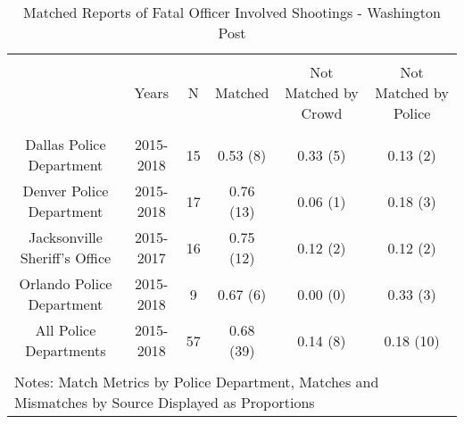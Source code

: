 
\begin{table}[!htbp] \centering 
  \caption{Matched Reports of Fatal Officer Involved Shootings - Washington Post} 
  \label{} 
\footnotesize 
\begin{tabular}{@{\extracolsep{5pt}} cccccc} 
\\[-1.8ex]\hline 
\hline \\[-1.8ex] 
 & Years & N & Matched & Not Matched by Crowd & Not Matched by Police \\ 
\hline \\[-1.8ex] 
Dallas Police Department & 2015-2018 & 15 & 0.53 (8) & 0.33 (5) & 0.13 (2) \\ 
Denver Police Department & 2015-2018 & 17 & 0.76 (13) & 0.06 (1) & 0.18 (3) \\ 
Jacksonville Sheriff's Office & 2015-2017 & 16 & 0.75 (12) & 0.12 (2) & 0.12 (2) \\ 
Orlando Police Department & 2015-2018 & 9 & 0.67 (6) & 0.00 (0) & 0.33 (3) \\ 
All Police Departments   & 2015-2018 & 57 & 0.68 (39) & 0.14 (8) & 0.18 (10) \\ 
\hline \\[-1.8ex] 
\multicolumn{6}{l}{Notes: Match Metrics by Police Department, Matches and Mismatches by Source Displayed as Proportions} \\ 
\end{tabular} 
\end{table}  
